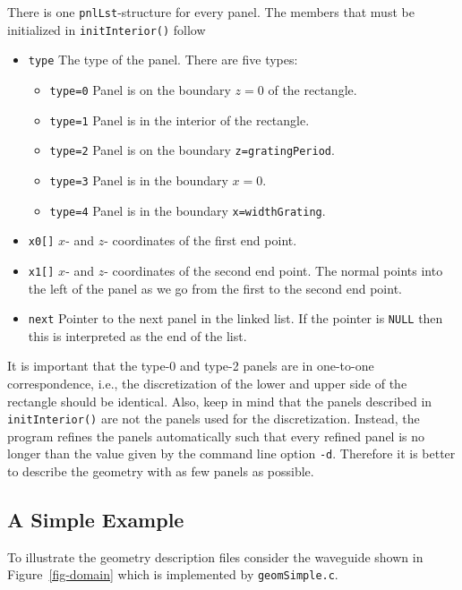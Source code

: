 \documentclass{article}
\begin{document}
There is one \texttt{pnlLst}-structure for every panel. The members
that must be initialized in \texttt{initInterior()} follow
\begin{itemize}
\item[]\texttt{type} The type of the panel. There are five types:
\begin{itemize}
  \item[]\texttt{type=0} Panel is on the boundary $z=0$ of the rectangle.
  \item[]\texttt{type=1} Panel is in the interior of the rectangle.
  \item[]\texttt{type=2} Panel is on the boundary \texttt{z=gratingPeriod}.
  \item[]\texttt{type=3} Panel is in the boundary $x=0$.
  \item[]\texttt{type=4} Panel is in the boundary \texttt{x=widthGrating}.
\end{itemize}
\item[]\texttt{x0[]} $x$- and $z$- coordinates of the first end point.
\item[]\texttt{x1[]} $x$- and $z$- coordinates of the second end
  point. The normal points into the left of the panel as we go from
  the first to the second end point.
\item[]\texttt{next} Pointer to the next panel in the linked list. If
  the pointer is \texttt{NULL} then this is interpreted as the end of
  the list.
\end{itemize}
It is important that the type-0 and type-2 panels are in one-to-one
correspondence, i.e., the discretization of the lower and upper side
of the rectangle should be identical. Also, keep in
mind that the panels described in \texttt{initInterior()} are not the
panels used for the discretization. Instead, the program refines the
panels automatically such that every refined panel is no longer than
the value given by the command line option \texttt{-d}. Therefore it
is better to describe the geometry with as few panels as possible.

\subsection{A Simple Example}
To illustrate the geometry description files consider the waveguide
shown in Figure~\ref{fig-domain} which is implemented by
\texttt{geomSimple.c}. 
\end{document}
